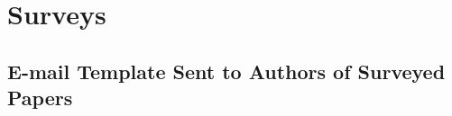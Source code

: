 \chapter{Surveys}\label{app:surveys}


\section{E-mail Template Sent to Authors of Surveyed Papers}
\label{sec:app_email}

